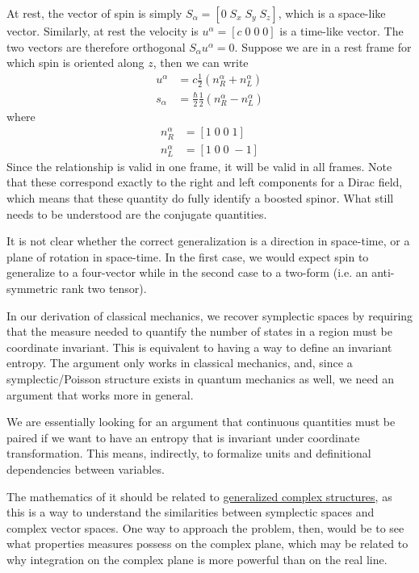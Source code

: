 At rest, the vector of spin is simply $S_\alpha = [ 0 \; S_x \; S_y \; S_z ]$, which is a space-like vector. Similarly, at rest the velocity is $u^\alpha = [c \; 0 \; 0 \; 0]$ is a time-like vector. The two vectors are therefore orthogonal $S_\alpha u^\alpha = 0$. Suppose we are in a rest frame for which spin is oriented along $z$, then we can write
\begin{align*}
	u^\alpha &= c \frac{1}{2} (n_R^\alpha + n_L^\alpha) \\
	s_\alpha &= \frac{\hbar}{2} \frac{1}{2} (n_R^\alpha - n_L^\alpha)
\end{align*}
where 
\begin{align*}
	n_R^\alpha &= [ 1 \; 0 \; 0 \; 1 ] \\
	n_L^\alpha &= [ 1 \; 0 \; 0 \; -1 ]
\end{align*}
Since the relationship is valid in one frame, it will be valid in all frames. Note that these correspond exactly to the right and left components for a Dirac field, which means that these quantity do fully identify a boosted spinor. What still needs to be understood are the conjugate quantities.

It is not clear whether the correct generalization is a direction in space-time, or a plane of rotation
in space-time. In the first case, we would expect spin to generalize to a four-vector
while in the second case to a two-form (i.e. an anti-symmetric rank two tensor).

{In our derivation of classical mechanics, we recover symplectic spaces by requiring that the measure needed to quantify the number	of states in a region must be coordinate invariant. This is equivalent to having a way to define an invariant entropy. The argument only works in classical mechanics, and, since a symplectic/Poisson structure exists in quantum mechanics as well, we need an argument that works more in general.}

We are essentially looking for an argument that continuous quantities must be paired if we want to have an entropy that is invariant under coordinate transformation. This means, indirectly, to formalize units and definitional dependencies between variables.

The mathematics of it should be related to \href{https://en.wikipedia.org/wiki/Generalized_complex_structure}{generalized complex structures}, as this is a way to understand the similarities between symplectic spaces and complex vector spaces. One way to approach the problem, then, would be to see what properties measures possess on the complex plane, which may be related to why integration on the complex plane is more powerful than on the real line.

